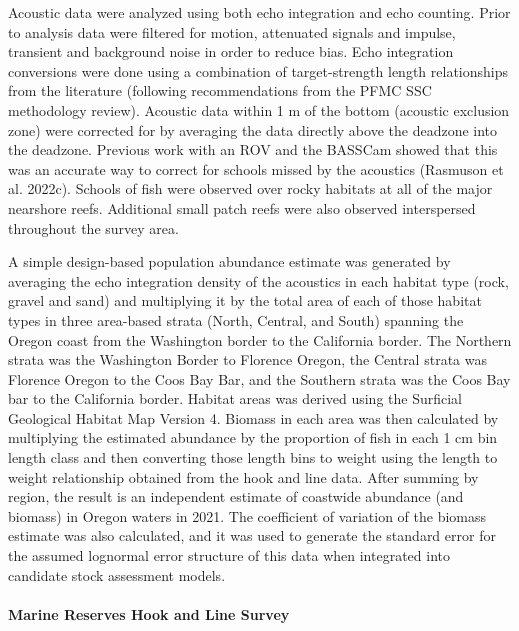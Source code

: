 \documentclass[11pt,
  english,
  letterpaper,
]{article}
\begin{document}
Acoustic data were analyzed using both echo integration and echo counting. Prior to analysis data were filtered for motion, attenuated signals and impulse, transient and background noise in order to reduce bias. Echo integration conversions were done using a combination of target-strength length relationships from the literature (following recommendations from the PFMC SSC methodology review). Acoustic data within 1 m of the bottom (acoustic exclusion zone) were corrected for by averaging the data directly above the deadzone into the deadzone. Previous work with an ROV and the BASSCam showed that this was an accurate way to correct for schools missed by the acoustics (Rasmuson et al. 2022c). Schools of fish were observed over rocky habitats at all of the major nearshore reefs. Additional small patch reefs were also observed interspersed throughout the survey area.

A simple design-based population abundance estimate was generated by averaging the echo integration density of the acoustics in each habitat type (rock, gravel and sand) and multiplying it by the total area of each of those habitat types in three area-based strata (North, Central, and South) spanning the Oregon coast from the Washington border to the California border. The Northern strata was the Washington Border to Florence Oregon, the Central strata was Florence Oregon to the Coos Bay Bar, and the Southern strata was the Coos Bay bar to the California border. Habitat areas was derived using the Surficial Geological Habitat Map Version 4. Biomass in each area was then calculated by multiplying the estimated abundance by the proportion of fish in each 1 cm bin length class and then converting those length bins to weight using the length to weight relationship obtained from the hook and line data. After summing by region, the result is an independent estimate of coastwide abundance (and biomass) in Oregon waters in 2021. The coefficient of variation of the biomass estimate was also calculated, and it was used to generate the standard error for the assumed lognormal error structure of this data when integrated into candidate stock assessment models.

\hypertarget{marine-reserves-hook-and-line-survey}{%
\paragraph{Marine Reserves Hook and Line Survey}\label{marine-reserves-hook-and-line-survey}}
\end{document}

